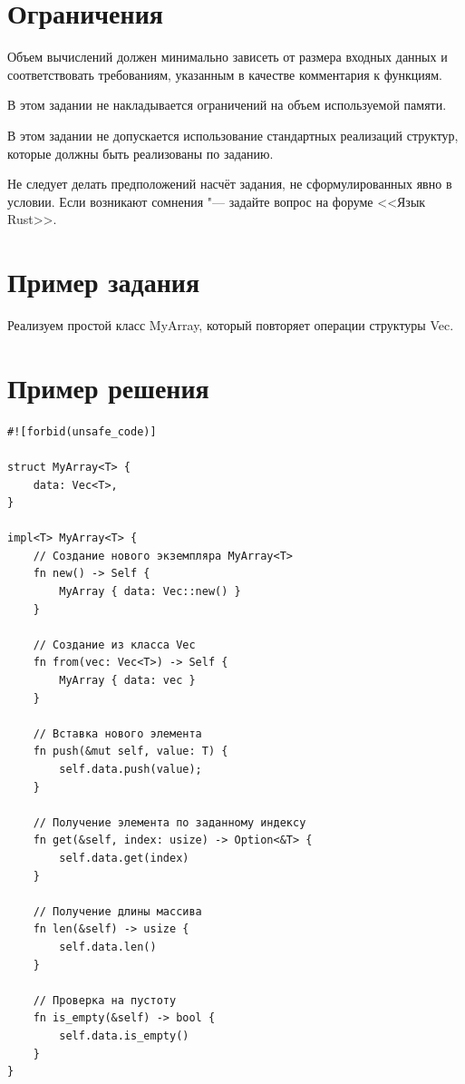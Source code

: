 \documentclass[a4paper, 10pt]{extarticle}
\begin{document}
\section{Ограничения}

\begin{importantblock}
    Объем вычислений должен минимально зависеть от размера входных данных и соответствовать требованиям, указанным в качестве комментария к функциям.

    В этом задании не накладывается ограничений на объем используемой памяти.
\end{importantblock}

\begin{importantblock}
    В этом задании не допускается использование стандартных реализаций структур, которые должны быть реализованы по заданию.
\end{importantblock}

\begin{importantblock}
Не следует делать предположений насчёт задания, не сформулированных явно в условии. Если возникают сомнения "--- задайте вопрос на форуме <<Язык Rust>>.
\end{importantblock}


\section{Пример задания}

\begin{tsk}
    Реализуем простой класс MyArray, который повторяет операции структуры Vec.
\end{tsk}

\section{Пример решения}
\begin{verbatim}
#![forbid(unsafe_code)]

struct MyArray<T> {
    data: Vec<T>,
}

impl<T> MyArray<T> {
    // Создание нового экземпляра MyArray<T>
    fn new() -> Self {
        MyArray { data: Vec::new() }
    }

    // Создание из класса Vec
    fn from(vec: Vec<T>) -> Self {
        MyArray { data: vec }
    }

    // Вставка нового элемента
    fn push(&mut self, value: T) {
        self.data.push(value);
    }

    // Получение элемента по заданному индексу
    fn get(&self, index: usize) -> Option<&T> {
        self.data.get(index)
    }

    // Получение длины массива
    fn len(&self) -> usize {
        self.data.len()
    }

    // Проверка на пустоту
    fn is_empty(&self) -> bool {
        self.data.is_empty()
    }
}  
\end{verbatim}
\end{document}
